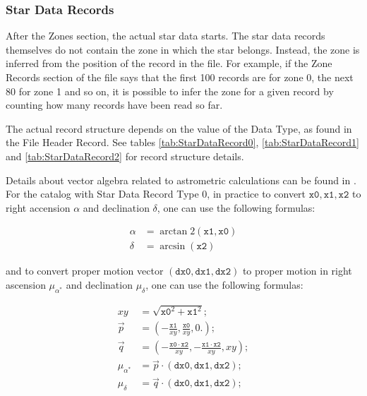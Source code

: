 \subsubsection{Star Data Records}%
\label{sec:Catalogues:stars:record:data}

After the Zones section, the actual star data starts. The star data
records themselves do not contain the zone in which the star belongs.
Instead, the zone is inferred from the position of the record in the
file. For example, if the Zone Records section of the file says that the
first 100 records are for zone 0, the next 80 for zone 1 and so on, it
is possible to infer the zone for a given record by counting how many
records have been read so far.

The actual record structure depends on the value of the Data Type, as
found in the File Header Record.
See tables 
\ref{tab:StarDataRecord0}, \ref{tab:StarDataRecord1} and \ref{tab:StarDataRecord2}
for record structure details.

Details about vector algebra related to astrometric calculations can be 
found in \citep{2012asas.book.....V}. For the catalog with Star Data Record 
Type 0, in practice to convert $\mathtt{x0}, \mathtt{x1}, \mathtt{x2}$ to 
right accension $\alpha$ and declination $\delta$, one can use the following 
formulas:

\begin{equation}
\begin{aligned}
\alpha &= \arctan2(\mathtt{x1}, \mathtt{x0})\\
\delta &= \arcsin(\mathtt{x2})
\end{aligned}
\end{equation}

and to convert proper motion vector $(\mathtt{dx0}, \mathtt{dx1}, \mathtt{dx2})$ to 
proper motion in right ascension $\mu_{\alpha^*}$ and declination $\mu_{\delta}$, 
one can use the following formulas:

\begin{equation}
\begin{aligned}
	xy &= \sqrt{\mathtt{x0}^2 + \mathtt{x1}^2}; \\
	\vec{p} &= \left(-\frac{\mathtt{x1}}{xy}, \frac{\mathtt{x0}}{xy}, 0.\right); \\
	\vec{q} &= \left(-\frac{\mathtt{x0} \cdot \mathtt{x2}}{xy}, -\frac{\mathtt{x1} \cdot \mathtt{x2}}{xy}, xy\right);\\
	\mu_{\alpha^*} &= \vec{p} \cdot \left(\mathtt{dx0}, \mathtt{dx1}, \mathtt{dx2}\right); \\
	\mu_{\delta} &= \vec{q} \cdot \left(\mathtt{dx0}, \mathtt{dx1}, \mathtt{dx2}\right);
\end{aligned}
\end{equation}

